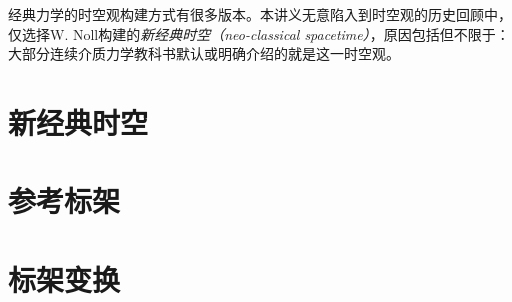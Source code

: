 \documentclass[zihao=-4,linespread=1.5,a4paper,heading=true,twoside]{ctexbook}
\theoremstyle{definition}
\theoremstyle{plain}
\begin{document}
经典力学的时空观构建方式有很多版本\cite{Weatherall2022}。本讲义无意陷入到时空观的历史回顾中，仅选择W. Noll\cite{Noll1973}构建的\emph{新经典时空（neo-classical spacetime）}，原因包括但不限于：大部分连续介质力学教科书默认或明确介绍的就是这一时空观。
\section{新经典时空}

\section{参考标架}

\section{标架变换}





%

%

%

%


\end{document}
